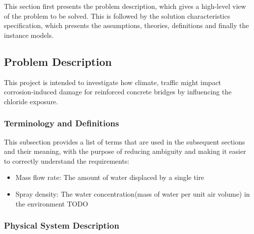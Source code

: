 \documentclass[12pt]{article}
\begin{document}
This section first presents the problem description, which gives a high-level
view of the problem to be solved.  This is followed by the solution characteristics
specification, which presents the assumptions, theories, definitions and finally
the instance models.  

\subsection{Problem Description} \label{Sec_pd}
This project is intended to investigate how climate, traffic might impact corrosion-induced damage for reinforced concrete bridges by influencing the chloride exposure.


\subsubsection{Terminology and  Definitions}


This subsection provides a list of terms that are used in the subsequent
sections and their meaning, with the purpose of reducing ambiguity and making it
easier to correctly understand the requirements:

\begin{itemize}
\item Mass flow rate: The amount of water displaced by a single tire 
\item Spray density: The water concentration(mass of water per unit air volume) in the environment
TODO

\end{itemize}

\subsubsection{Physical System Description} \label{sec_phySystDescrip}
\end{document}
